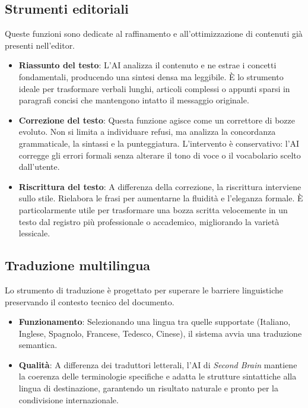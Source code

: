\documentclass[11pt,a4paper]{article}
\begin{document}
\subsection{Strumenti editoriali}
Queste funzioni sono dedicate al raffinamento e all'ottimizzazione di contenuti già presenti nell'editor.
\begin{itemize}
    \item \textbf{Riassunto del testo}: L'AI analizza il contenuto e ne estrae i concetti fondamentali, producendo una sintesi densa ma leggibile. È lo strumento ideale per trasformare verbali lunghi, articoli complessi o appunti sparsi in paragrafi concisi che mantengono intatto il messaggio originale.
    \item \textbf{Correzione del testo}: Questa funzione agisce come un correttore di bozze evoluto. Non si limita a individuare refusi, ma analizza la concordanza grammaticale, la sintassi e la punteggiatura. L'intervento è conservativo: l'AI corregge gli errori formali senza alterare il tono di voce o il vocabolario scelto dall'utente.
    \item \textbf{Riscrittura del testo}: A differenza della correzione, la riscrittura interviene sullo stile. Rielabora le frasi per aumentarne la fluidità e l'eleganza formale. È particolarmente utile per trasformare una bozza scritta velocemente in un testo dal registro più professionale o accademico, migliorando la varietà lessicale.
\end{itemize}

\subsection{Traduzione multilingua}
Lo strumento di traduzione è progettato per superare le barriere linguistiche preservando il contesto tecnico del documento.
\begin{itemize}
    \item \textbf{Funzionamento}: Selezionando una lingua tra quelle supportate (Italiano, Inglese, Spagnolo, Francese, Tedesco, Cinese), il sistema avvia una traduzione semantica.
    \item \textbf{Qualità}: A differenza dei traduttori letterali, l'AI di \textit{Second Brain} mantiene la coerenza delle terminologie specifiche e adatta le strutture sintattiche alla lingua di destinazione, garantendo un risultato naturale e pronto per la condivisione internazionale.
\end{itemize}
\end{document}
